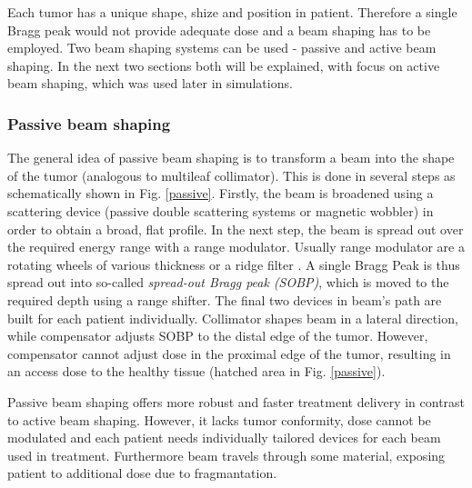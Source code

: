 \documentclass[type=dr, dr=rernat, accentcolor=tud7b,colorbacktitle, bigchapter, openright, twoside, 12pt ]{tudthesis}
\begin{document}
Each tumor has a unique shape, shize and position in patient. Therefore a single Bragg peak would not provide adequate dose and a beam shaping has to be employed. Two beam shaping systems
can be used - passive and active beam shaping. In the next two sections both will be explained, with focus on active beam shaping, which was used later in simulations.


\subsubsection{Passive beam shaping}

The general idea of passive beam shaping is to transform a beam into the shape of the tumor (analogous to multileaf collimator). This is done in several steps as schematically shown in Fig. \ref{passive}. Firstly, the beam is broadened using a scattering device (passive double scattering systems or magnetic wobbler)
 in order to obtain a broad, flat profile. In the next step, the beam is spread out over the required energy range with a range modulator. Usually range modulator are a rotating wheels of various thickness or a ridge filter \cite{Chu1993}.
 A single Bragg Peak is thus spread out into so-called \textit{spread-out Bragg peak (SOBP)}, which is moved to the required depth using a range shifter. The final two devices in beam's path are built for each patient individually. Collimator
 shapes beam in a lateral direction, while compensator adjusts SOBP to the distal edge of the tumor. However, compensator cannot adjust dose in the proximal edge of the tumor, resulting in an access dose to the healthy tissue (hatched area in
 Fig. \ref{passive}).
 
 Passive beam shaping offers more robust and faster treatment delivery in contrast to active beam shaping. However, it lacks tumor conformity, dose cannot be modulated and each patient needs individually tailored devices for each beam used in treatment.
 Furthermore beam travels through some material, exposing patient to additional dose due to fragmantation.
\end{document}
